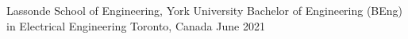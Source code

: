 


\begin{cventries}


\cventry
{Lassonde School of Engineering, York University} %
{Bachelor of Engineering (BEng) in Electrical Engineering} %
{Toronto, Canada} %
{June 2021} %
{ %
\begin{cvitems}
\end{cvitems}
}


\end{cventries}